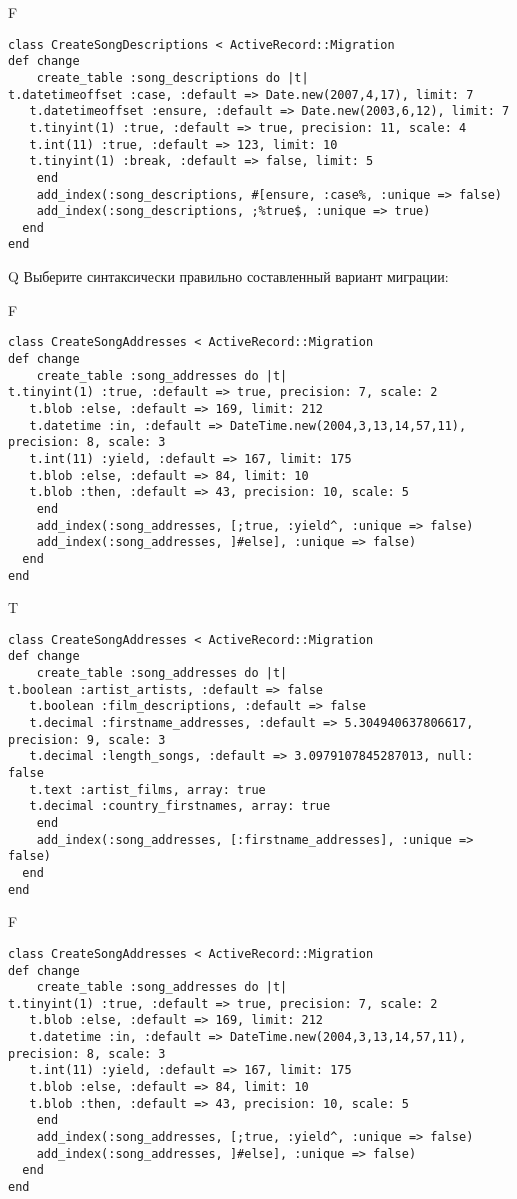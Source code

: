 F
\begin{verbatim}
class CreateSongDescriptions < ActiveRecord::Migration
def change
	create_table :song_descriptions do |t|
t.datetimeoffset :case, :default => Date.new(2007,4,17), limit: 7
   t.datetimeoffset :ensure, :default => Date.new(2003,6,12), limit: 7
   t.tinyint(1) :true, :default => true, precision: 11, scale: 4
   t.int(11) :true, :default => 123, limit: 10
   t.tinyint(1) :break, :default => false, limit: 5
   	end
	add_index(:song_descriptions, #[ensure, :case%, :unique => false)
 	add_index(:song_descriptions, ;%true$, :unique => true)
  end 
end

\end{verbatim}

Q
Выберите синтаксически правильно составленный вариант миграции:

F
\begin{verbatim}
class CreateSongAddresses < ActiveRecord::Migration
def change
	create_table :song_addresses do |t|
t.tinyint(1) :true, :default => true, precision: 7, scale: 2
   t.blob :else, :default => 169, limit: 212
   t.datetime :in, :default => DateTime.new(2004,3,13,14,57,11), precision: 8, scale: 3
   t.int(11) :yield, :default => 167, limit: 175
   t.blob :else, :default => 84, limit: 10
   t.blob :then, :default => 43, precision: 10, scale: 5
   	end
	add_index(:song_addresses, [;true, :yield^, :unique => false)
 	add_index(:song_addresses, ]#else], :unique => false)
  end 
end

\end{verbatim}

T
\begin{verbatim}
class CreateSongAddresses < ActiveRecord::Migration
def change
	create_table :song_addresses do |t|
t.boolean :artist_artists, :default => false
   t.boolean :film_descriptions, :default => false
   t.decimal :firstname_addresses, :default => 5.304940637806617, precision: 9, scale: 3
   t.decimal :length_songs, :default => 3.0979107845287013, null: false
   t.text :artist_films, array: true
   t.decimal :country_firstnames, array: true
   	end
	add_index(:song_addresses, [:firstname_addresses], :unique => false)
  end 
end

\end{verbatim}

F
\begin{verbatim}
class CreateSongAddresses < ActiveRecord::Migration
def change
	create_table :song_addresses do |t|
t.tinyint(1) :true, :default => true, precision: 7, scale: 2
   t.blob :else, :default => 169, limit: 212
   t.datetime :in, :default => DateTime.new(2004,3,13,14,57,11), precision: 8, scale: 3
   t.int(11) :yield, :default => 167, limit: 175
   t.blob :else, :default => 84, limit: 10
   t.blob :then, :default => 43, precision: 10, scale: 5
   	end
	add_index(:song_addresses, [;true, :yield^, :unique => false)
 	add_index(:song_addresses, ]#else], :unique => false)
  end 
end

\end{verbatim}

